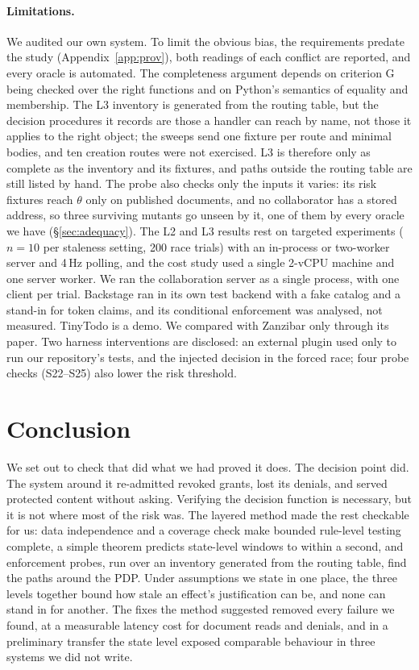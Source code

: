 \paragraph{Limitations.} We audited our own system. To limit the obvious bias, the requirements predate the
study (Appendix~\ref{app:prov}), both readings of each conflict are reported, and every oracle is automated. The
completeness argument depends on criterion G being checked over the right functions and on Python's semantics of
equality and membership. The L3 inventory is generated from the routing table, but the decision procedures it records are those a
handler can reach by name, not those it applies to the right object; the sweeps send one fixture per route and
minimal bodies, and ten creation routes were not exercised. L3 is therefore only as complete as the inventory and
its fixtures, and paths outside the routing table are still listed by hand. The probe also checks only the inputs it varies: its risk fixtures reach $\theta$ only on published documents, and no collaborator has a stored address, so three surviving mutants go unseen by it, one of them by every oracle we have (\S\ref{sec:adequacy}).
The L2 and L3 results rest on targeted experiments ($n=10$ per staleness setting, 200 race trials) with an
in-process or two-worker server and 4\,Hz polling, and the cost study used a single 2-vCPU machine and one
server worker. We ran the collaboration server as a single process, with one client per trial.
Backstage ran in its own test backend with a fake catalog and a stand-in for token claims, and its conditional
enforcement was analysed, not measured. TinyTodo is a demo. We compared with Zanzibar only through its paper.
Two harness interventions are disclosed: an external plugin used only to run our repository's tests, and the
injected decision in the forced race; four probe checks (S22--S25) also lower the risk threshold.

\section{Conclusion}

We set out to check that \sysname did what we had proved it does. The decision point did. The system around it
re-admitted revoked grants, lost its denials, and served protected content without asking. Verifying the
decision function is necessary, but it is not where most of the risk was. The layered method made the rest
checkable for us: data independence and a coverage check make bounded rule-level testing complete, a simple
theorem predicts state-level windows to within a second, and enforcement probes, run over an inventory generated
from the routing table, find the paths around the PDP. Under assumptions we state in one place, the three levels
together bound how stale an effect's justification can be, and none can stand in for another. The fixes the method
suggested removed every failure we found, at a measurable latency cost for document reads and denials, and in a
preliminary transfer the state level exposed comparable behaviour in three systems we did not write.

